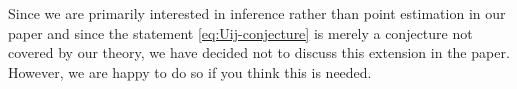 \documentclass[a4paper,12pt]{article}
\begin{document}
\begin{enumerate}[label=(\arabic*),leftmargin=0.7cm]
Since we are primarily interested in inference rather than point estimation in our paper and since the statement \eqref{eq:Uij-conjecture} is merely a conjecture not covered by our theory, we have decided not to discuss this extension in the paper. However, we are happy to do so if you think this is needed. 
 











\end{enumerate}
\end{document}
